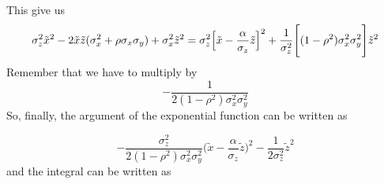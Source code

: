 \documentclass{article}
\begin{document}
This give us
\begin{equation}
    \sigma^2_z {\tilde x}^2 - 2 \tilde x \tilde z (\sigma^2_x + \rho \sigma_x \sigma_y ) + \sigma_x^2 {\tilde z}^2 = \sigma_z^2 \Bigl[ {\tilde x} - \frac{\alpha}{\sigma_z} {\tilde z} \Bigr]^2
    + \frac{1}{\sigma^2_z} 
            \Biggl[
                (1-\rho^2)\sigma_x^2 \sigma_y^2
            \Biggr] {\tilde z}^2
\end{equation}
Remember that we have to multiply by 
\begin{equation}
    -\frac{1}{2(1 - \rho^2) \sigma_x^2 \sigma_y^2}
\end{equation}
So, finally, the argument of the exponential function can be written as

\begin{equation}
    - \frac{\sigma^2_z}{2(1-\rho^2)\sigma^2_x\sigma^2_y} \Biggl( \tilde x - \frac{\alpha}{\sigma_z} \tilde z \Biggr)^2 - \frac{1}{2 \sigma^2_z} {\tilde z}^2
\end{equation}
and the integral can be written as 
\end{document}
